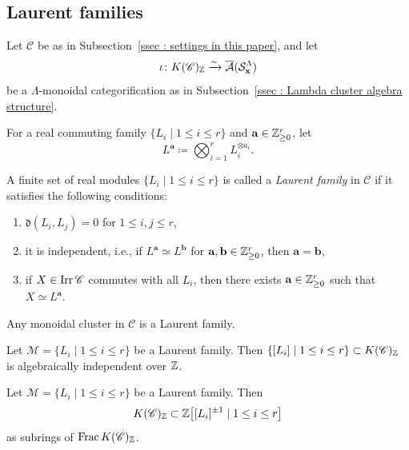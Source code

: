 \subsection{Laurent families}
\label{ssec : Laurent families}

Let $\mathscr{C}$ be as in
Subsection~\ref{ssec : settings in this paper}, and let
\[
\iota \colon K(\mathscr{C})_{\mathbb{Z}}
\xrightarrow{\sim}
\overline{\mathcal{A}}(\mathcal{S}_{\mathbf{x}}^{\Lambda})
\]
be a $\Lambda$-monoidal categorification as in
Subsection~\ref{ssec : Lambda cluster algebra structure}.

For a real commuting family $\{L_i \mid 1 \leq i \leq r\}$
and $\mathbf{a} \in \mathbb{Z}_{\geq 0}^r$, let
\[
L^{\mathbf{a}} \coloneq \bigotimes_{i=1}^r L_i^{\otimes a_i}.
\]

\begin{Def}
\label{Def : Laurent family}
A finite set of real modules $\{L_i \mid 1 \leq i \leq r\}$
is called a \emph{Laurent family} in $\mathscr{C}$
if it satisfies the following conditions:
\begin{enumerate}
    \item[(i)] $\mathfrak{d}(L_i, L_j) = 0$
    for $1 \leq i, j \leq r$,
    \item[(ii)] it is independent, i.e.,
    if $L^{\mathbf{a}} \simeq L^{\mathbf{b}}$
    for $\mathbf{a}, \mathbf{b} \in \mathbb{Z}_{\geq 0}^r$,
    then $\mathbf{a} = \mathbf{b}$,
    \item[(iii)] if $X \in \mathop{\mathrm{Irr}}\nolimits\mathscr{C}$ commutes with all $L_i$,
    then there exists $\mathbf{a} \in \mathbb{Z}_{\geq 0}^r$
    such that $X \simeq L^{\mathbf{a}}$.
\end{enumerate}
\end{Def}

\begin{Prop}
\label{Prop : monoidal clusters are Laurent families}
Any monoidal cluster in $\mathscr{C}$ is a Laurent family.
\end{Prop}

\begin{Lem}
\label{Lem : algebraic independence of Laurent families}
Let $\mathcal{M} = \{L_i \mid 1 \leq i \leq r\}$
be a Laurent family.
Then $\{[L_i] \mid 1 \leq i \leq r\} \subset K(\mathscr{C})_{\mathbb{Z}}$
is algebraically independent over $\mathbb{Z}$.
\end{Lem}

\begin{Prop}
\label{Prop : Laurent expansions with respect to a Laurent family}
Let $\mathcal{M} = \{L_i \mid 1 \leq i \leq r\}$
be a Laurent family.
Then
\[
K(\mathscr{C})_{\mathbb{Z}}
\subset \mathbb{Z}\bigl[[L_i]^{\pm 1} \mid 1 \leq i \leq r\bigr]
\]
as subrings of $\operatorname{Frac}K(\mathscr{C})_{\mathbb{Z}}$.
\end{Prop}

